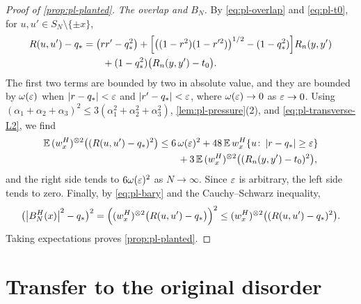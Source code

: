 \begin{proof}[Proof of \cref{prop:pl-planted}]
\emph{The overlap and $B_N$.} By \eqref{eq:pl-overlap} and \eqref{eq:pl-t0}, for $u,u'\in S_N\setminus\{\pm x\}$,
\[
\begin{aligned}
R(u,u')-q_*&=\bigl(rr'-q_*^2\bigr)+\Bigl[\bigl((1-r^2)(1-r'^2)\bigr)^{1/2}-(1-q_*^2)\Bigr]R_n(y,y')\\
&\qquad+(1-q_*^2)\bigl(R_n(y,y')-t_0\bigr).
\end{aligned}
\]
The first two terms are bounded by two in absolute value, and they are bounded by $\omega(\varepsilon)$ when $\left|r-q_*\right|<\varepsilon$ and $\left|r'-q_*\right|<\varepsilon$, where $\omega(\varepsilon)\to0$ as $\varepsilon\to0$. Using $(\alpha_1+\alpha_2+\alpha_3)^2\le3(\alpha_1^2+\alpha_2^2+\alpha_3^2)$, \cref{lem:pl-pressure}(2), and \eqref{eq:pl-transverse-L2}, we find
\[
\begin{aligned}
\mathbb E\,(w_x^H)^{\otimes2}\bigl((R(u,u')-q_*)^2\bigr)&\le6\,\omega(\varepsilon)^2+48\,\mathbb E\,w_x^H\{u\colon\left|r-q_*\right|\ge\varepsilon\}\\
&\qquad+3\,\mathbb E\,(w_x^H)^{\otimes2}\bigl((R_n(y,y')-t_0)^2\bigr),
\end{aligned}
\]
and the right side tends to $6\omega(\varepsilon)^2$ as $N\to\infty$. Since $\varepsilon$ is arbitrary, the left side tends to zero. Finally, by \eqref{eq:pl-bary} and the Cauchy--Schwarz inequality,
\[
\bigl(\left|B_N^H(x)\right|^2-q_*\bigr)^2=\Bigl((w_x^H)^{\otimes2}\bigl(R(u,u')-q_*\bigr)\Bigr)^2\le(w_x^H)^{\otimes2}\bigl((R(u,u')-q_*)^2\bigr).
\]
Taking expectations proves \cref{prop:pl-planted}.
\end{proof}


\section{Transfer to the original disorder}\label{sec:pl-transfer}

